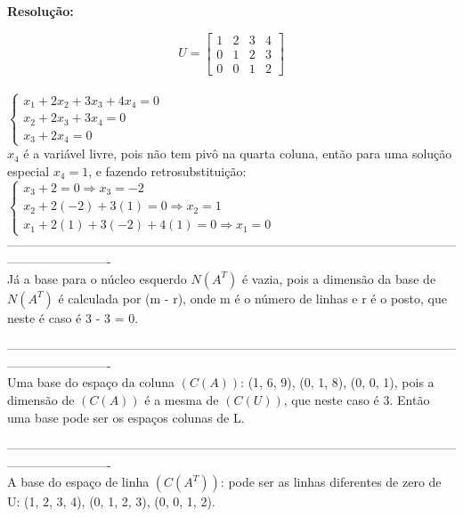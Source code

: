 \documentclass[leqno]{article}
\numberwithin{equation}{section}
\theoremstyle{definition}
\newenvironment{sol}
	{
		\vspace{4mm}
		\noindent\textbf{Resolução:}
		\strut\newline
		\smallskip
		\hspace{-3.5mm}
	}
	{}
\begin{document}
\begin{enumerate}
\begin{sol}
		$$U = \begin{bmatrix}
			1 & 2 & 3 & 4 \\
			0 & 1 & 2 & 3 \\
			0 & 0 & 1 & 2
		\end{bmatrix}$$\\
		
		$
		\left\{
		\begin {array}{l}
		x_1 + 2x_2 + 3x_3 + 4x_4 = 0\\
		x_2 + 2x_3 + 3x_4 = 0\\
		x_3 + 2x_4 = 0
		\end{array}
		\right.$\\
		
		$x_4$ é a variável livre, pois não tem pivô na quarta coluna, então para uma solução especial $x_4 = 1$, e fazendo retrosubstituição:\\
		
		$
		\left\{
		\begin {array}{l}
		x_3 + 2 = 0 \Rightarrow x_3 = -2\\
		x_2 + 2(-2) + 3(1) = 0 \Rightarrow x_2 = 1 \\
		x_1 + 2(1) + 3(-2) + 4(1) = 0 \Rightarrow x_1 = 0
		\end{array}
		\right.$\\
		
		-------------------------------------------------------------------------------------------------------------------------------------\\
		
		Já a base para o núcleo esquerdo $N(A^T)$ é vazia, pois a dimensão da base de $N(A^T)$ é calculada por (m - r), onde m é o número de linhas e r é o posto, que neste é caso é 3 - 3 = 0.
		
		-------------------------------------------------------------------------------------------------------------------------------------\\
		
		Uma base do espaço da coluna $(C(A))$: (1, 6, 9), (0, 1, 8), (0, 0, 1), pois a dimensão de $(C(A))$ é a mesma de $(C(U))$, que neste caso é 3. Então uma base pode ser os espaços colunas de L.
		
		-------------------------------------------------------------------------------------------------------------------------------------\\
		
		A base do espaço de linha $(C(A^{T}))$: pode ser as linhas diferentes de zero de U: (1, 2, 3, 4), (0, 1, 2, 3), (0, 0, 1, 2).
		

\end{sol}
\end{enumerate}
\end{document}
